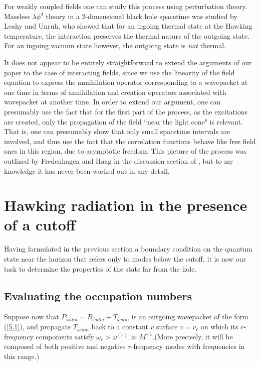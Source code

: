 \documentclass[12pt]{article}
\def\o{\omega}
\def\obar{\bar{\omega}}
\def\ubar{\bar{u}}
\begin{document}
For weakly coupled fields one can study this process using
perturbation theory. Massless $\lambda\phi^4$ theory in a
2-dimensional black hole spacetime was studied by Leahy and
Unruh\cite{LeahUn}, who showed that for an ingoing thermal
state at the Hawking temperature, the interaction preserves
the thermal nature of the outgoing state. For an ingoing
vacuum state however, the outgoing state is {\it not}
thermal.

It does not appear to be entirely straightforward to extend
the arguments of our paper to the case of interacting
fields, since we use the linearity of the field equation
to express the annihilation operator corresponding to a
wavepacket at one time in terms of annihilation and creation
operators associated with wavepacket at another time.
In order to extend our argument, one can presumably use the
fact that for the first part of the process, as the
excitations are created, only the propagation of the field
``near the light cone" is relevant. That is, one can
presumably show that only small spacetime intervals are
involved, and thus use the fact that the correlation
functions behave like free field ones in this region, due to
asymptotic freedom. This picture of the process was
outlined by Fredenhagen and Haag in the discussion section
of \cite{FredHaag}, but to my knowledge it has never been worked
out in any detail.

\section{Hawking radiation in the presence of a cutoff}
\label{sec:5}

Having formulated in the previous section a boundary condition on
the quantum state near the horizon that refers only to modes below the
cutoff, it is now our task to determine the properties of the state
far from the hole.

\subsection{Evaluating the occupation numbers}

Suppose now that
$P_{\obar\ubar lm}= R_{\obar\ubar lm}+ T_{\obar\ubar lm}$ is
an outgoing wavepacket of
the form (\ref{5.1}), and
propagate $T_{\obar\ubar lm}$ back to a constant $v$
surface $v=v_c$ on which its $r$-frequency
components satisfy $\o_c>\o^{(r)}\gg M^{-1}$.(More
precisely, it will be composed of both positive and negative
$r$-frequency modes with frequencies in this range.)
\end{document}
